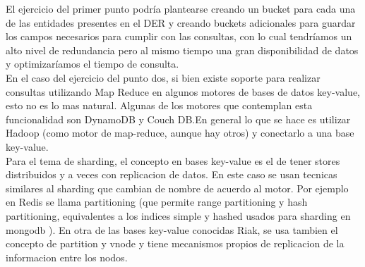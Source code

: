 El ejercicio del primer punto podr\'ia plantearse creando un bucket para cada una de las entidades presentes en el DER y creando buckets adicionales para guardar los campos necesarios para cumplir con las consultas, con lo cual tendr\'iamos un alto nivel de redundancia pero al mismo tiempo una gran disponibilidad de datos y optimizar\'iamos el tiempo de consulta.\\

En el caso del ejercicio del punto dos, si bien existe soporte para realizar consultas utilizando Map Reduce en algunos motores de bases de datos key-value, esto no es lo mas natural. Algunas de los motores que contemplan esta funcionalidad son DynamoDB y Couch DB.En general lo que se hace es utilizar Hadoop (como motor de map-reduce, aunque hay otros) y conectarlo a una base key-value.\\

Para el tema de sharding, el concepto en bases key-value es el de tener stores distribuidos y a veces con replicacion de datos. En este caso se usan tecnicas similares al sharding que cambian de nombre de acuerdo al motor. Por ejemplo en Redis se llama partitioning (que permite range partitioning y hash partitioning, equivalentes a los indices simple y hashed usados para sharding en mongodb ). En otra de las bases key-value conocidas Riak, se usa tambien el concepto de partition y vnode y tiene mecanismos propios de replicacion de la informacion entre los nodos.




